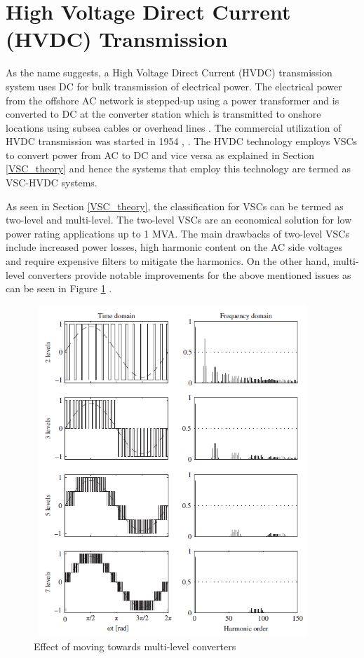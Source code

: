 \section{High Voltage Direct Current (HVDC) Transmission}\label{HVDC_trans_theory}
As the name suggests, a High Voltage Direct Current (\gls{HVDC}) transmission system uses \gls{DC} for bulk transmission of electrical power. The electrical power from the offshore \gls{AC} network is stepped-up using a power transformer and is converted to \gls{DC} at the converter station which is transmitted to onshore locations using subsea cables or overhead lines \cite{abbreviewnew}. The commercial utilization of \gls{HVDC} transmission was started in 1954 \cite{cigre2005b4}, \cite{peake_history_2010}. The \gls{HVDC} technology employs \gls{VSC}s to convert power from \gls{AC} to \gls{DC} and vice versa as explained in Section \ref{VSC_theory} and hence the systems that employ this technology are termed as \gls{VSC}-\gls{HVDC} systems.

As seen in Section \ref{VSC_theory}, the classification for \gls{VSC}s can be termed as two-level and multi-level. The two-level \gls{VSC}s are an economical solution for low power rating applications up to 1 MVA. The main drawbacks of two-level \gls{VSC}s include increased power losses, high harmonic content on the \gls{AC} side voltages and require expensive filters to mitigate the harmonics. On the other hand, multi-level converters provide notable improvements for the above mentioned issues as can be seen in Figure \ref{fig:2levelVSCtoMMC} \cite{sharifabadi2016design}.   

\begin{figure}[H]
\centering
    \includegraphics[height = 12.5cm,width = 10.5cm]{Diagrams/Chapter_2/2levelVSCtoMMC.PNG}
    \caption{Effect of moving towards multi-level converters \cite{sharifabadi2016design}}
    \label{fig:2levelVSCtoMMC}
\end{figure}


